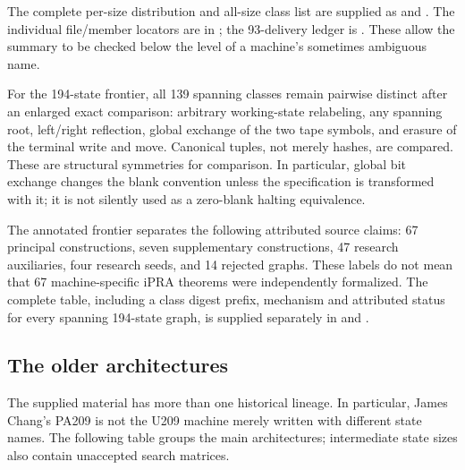 The complete per-size distribution and all-size class list are supplied as
 and
. The individual file/member locators are
in ; the 93-delivery ledger is
. These allow the summary to be checked below the
level of a machine's sometimes ambiguous name.

For the 194-state frontier, all 139 spanning classes remain pairwise distinct
after an enlarged exact comparison: arbitrary working-state relabeling, any
spanning root, left/right reflection, global exchange of the two tape symbols,
and erasure of the terminal write and move. Canonical tuples, not merely
hashes, are compared. These are structural symmetries for comparison. In
particular, global bit exchange changes the blank convention unless the
specification is transformed with it; it is not silently used as a zero-blank
halting equivalence.

The annotated frontier separates the following attributed source claims:
67 principal constructions, seven supplementary constructions, 47 research
auxiliaries, four research seeds, and 14 rejected graphs. These labels do not
mean that 67 machine-specific iPRA theorems were independently formalized.
The complete table, including a class digest prefix, mechanism and attributed
status for every spanning 194-state graph, is supplied separately in
 and
.

\subsection{The older architectures}

The supplied material has more than one historical lineage. In particular,
James Chang's PA209 is not the U209 machine merely written with different
state names. The following table groups the main architectures; intermediate
state sizes also contain unaccepted search matrices.

